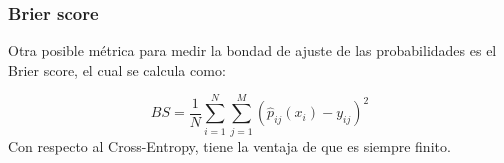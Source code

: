 \subsubsection{Brier score}\label{calibracion:Brier score}

Otra posible métrica para medir la bondad de ajuste de las probabilidades es el
Brier score, el cual se calcula como:

$$ BS = \frac{1}{N}\sum _{i=1}^{N} \sum _{j=1}^{M} (\hat p_{ij}(x_i) - y_{ij})^2
$$ Con respecto al Cross-Entropy, tiene la ventaja de que es siempre finito.

